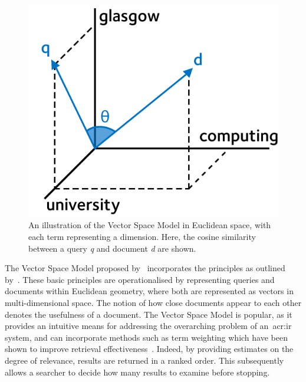 \begin{figure}
    \begin{center}
    \vspace*{-8mm}
    \includegraphics[width=1\textwidth]{figures/ch2-vector.pdf}
    \end{center}
    \vspace*{-2mm}
    \caption[Vector Space Model (Cosine similarity)]{An illustration of the Vector Space Model in Euclidean space, with each term representing a dimension. Here, the cosine similarity between a query \emph{q} and document \emph{d} are shown.}
    \label{fig:vector_space}
\end{figure}

The Vector Space Model proposed by~\cite{salton1975vsm} incorporates the principles as outlined by~\cite{luhn1957ranking_query}. These basic principles are operationalised by representing queries and documents within Euclidean geometry, where both are represented as vectors in multi-dimensional space. The notion of how close documents appear to each other denotes the usefulness of a document. The Vector Space Model is popular, as it provides an intuitive means for addressing the overarching problem of an~\gls{acr:ir} system, and can incorporate methods such as term weighting which have been shown to improve retrieval effectiveness~\citep{croft2010search}. Indeed, by providing estimates on the degree of relevance, results are returned in a ranked order. This subsequently allows a searcher to decide how many results to examine before stopping.

